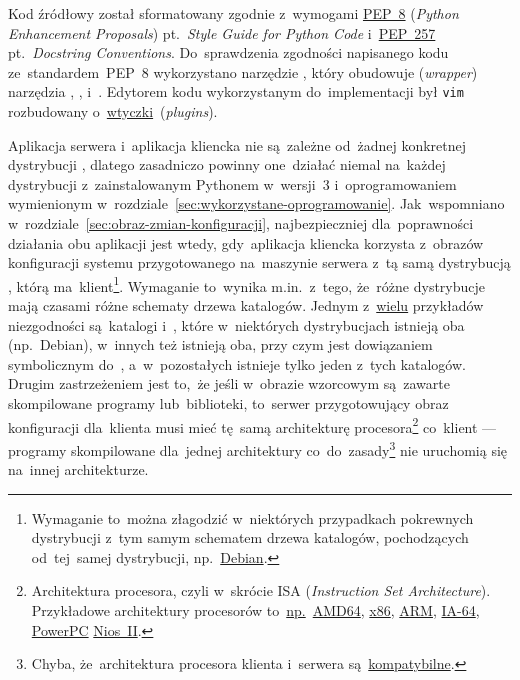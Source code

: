 \documentclass[thesis]{subfiles}
\begin{document}
Kod źródłowy został sformatowany zgodnie z~wymogami \href{https://www.python.org/dev/peps/pep-0008/}{PEP~8} (\emph{Python Enhancement Proposals}) pt.~\emph{Style Guide for Python Code} i~\href{https://www.python.org/dev/peps/pep-0257/}{PEP~257} pt.~\emph{Docstring Conventions}. Do~sprawdzenia zgodności napisanego kodu ze~standardem~PEP~8 wykorzystano narzędzie , który obudowuje (\emph{wrapper}) narzędzia , ,  i~. Edytorem kodu wykorzystanym do~implementacji był \texttt{vim} rozbudowany o~\href{http://vimawesome.com/}{wtyczki}~(\emph{plugins}).

Aplikacja serwera i~aplikacja kliencka nie są~zależne od~żadnej konkretnej dystrybucji , dlatego zasadniczo powinny one~działać niemal na~każdej dystrybucji z~zainstalowanym Pythonem w~wersji~3 i~oprogramowaniem wymienionym w~rozdziale~\ref{sec:wykorzystane-oprogramowanie}. Jak~wspomniano w~rozdziale~\ref{sec:obraz-zmian-konfiguracji}, najbezpieczniej dla~poprawności działania obu aplikacji jest wtedy, gdy~aplikacja kliencka korzysta z~obrazów konfiguracji systemu przygotowanego na~maszynie serwera z~tą samą dystrybucją , którą ma~klient\footnote{Wymaganie to~można złagodzić w~niektórych przypadkach pokrewnych dystrybucji z~tym samym schematem drzewa katalogów, pochodzących od~tej~samej dystrybucji, np.~\href{https://en.wikipedia.org/wiki/Debian}{Debian}.}. Wymaganie to~wynika m.in.~z~tego, że~różne dystrybucje mają czasami różne schematy drzewa katalogów. Jednym z~\href{https://en.wikipedia.org/wiki/Filesystem_Hierarchy_Standard#FHS_compliance}{wielu} przykładów niezgodności są~katalogi  i~, które w~niektórych dystrybucjach istnieją oba (np.~Debian), w~innych też istnieją oba, przy czym  jest dowiązaniem symbolicznym do~, a~w~pozostałych istnieje tylko jeden z~tych katalogów. Drugim zastrzeżeniem jest to,~że jeśli w~obrazie wzorcowym są~zawarte skompilowane programy lub~biblioteki, to~serwer przygotowujący obraz konfiguracji dla~klienta musi mieć tę~samą architekturę procesora\footnote{Architektura procesora, czyli w~skrócie ISA (\emph{Instruction Set Architecture}). Przykładowe architektury procesorów to~\href{https://en.wikipedia.org/wiki/List_of_instruction_sets}{np.}~\href{https://en.wikipedia.org/wiki/X86-64}{AMD64}, \href{https://en.wikipedia.org/wiki/X86}{x86}, \href{https://en.wikipedia.org/wiki/ARM_architecture}{ARM}, \href{https://en.wikipedia.org/wiki/IA-64}{IA-64}, \href{https://en.wikipedia.org/wiki/PowerPC}{PowerPC} \href{https://en.wikipedia.org/wiki/Nios_II}{Nios~II}.} co~klient --- programy skompilowane dla~jednej architektury co~do~zasady\footnote{Chyba, że~architektura procesora klienta i~serwera są~\href{https://en.wikipedia.org/wiki/X86-64\#OPMODES}{kompatybilne}.} nie uruchomią się na~innej architekturze.
\end{document}

